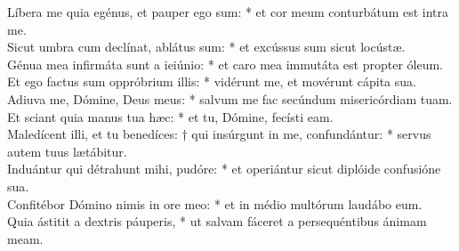 {	Líbera me quia egénus, et pauper ego sum: * et cor meum conturbátum est intra me. \\
	Sicut umbra cum declínat, ablátus sum: * et excússus sum sicut locústæ. \\
	Génua mea infirmáta sunt a ieiúnio: * et caro mea immutáta est propter óleum. \\
	Et ego factus sum oppróbrium illis: * vidérunt me, et movérunt cápita sua. \\
	Adiuva me, Dómine, Deus meus: * salvum me fac secúndum misericórdiam tuam. \\
	Et sciant quia manus tua hæc: * et tu, Dómine, fecísti eam. \\
	Maledícent illi, et tu benedíces: † qui insúrgunt in me, confundántur: * servus autem tuus lætábitur. \\
	Induántur qui détrahunt mihi, pudóre: * et operiántur sicut diplóide confusióne sua. \\
	Confitébor Dómino nimis in ore meo: * et in médio multórum laudábo eum. \\
	Quia ástitit a dextris páuperis, * ut salvam fáceret a persequéntibus ánimam meam. \\
}


